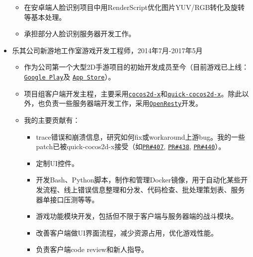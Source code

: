 \documentclass[letterpaper]{article}
\begin{document}
\begin{itemize}
\begin{itemize}
      \item 在安卓端人脸识别项目中用RenderScript优化图片YUV/RGB转化及旋转等基本处理。
      \item 承担部分人脸识别服务器开发工作。
    \end{itemize}
  \item 乐其公司新游地工作室游戏开发工程师，2014年7月-2017年5月
    \begin{itemize}
      \item 作为公司第一个大型2D手游项目的初始开发成员至今（目前游戏已上线：
        \href{https://play.google.com/store/apps/details?id=com.game168.yysg}{\tt Google Play}及
        \href{https://itunes.apple.com/us/app/ye-ye-san-guo/id976517523?mt=8}{\tt App Store}）。
      \item 项目组客户端开发主程，主要采用\href{http://cocos2d-x.org/}{\tt cocos2d-x}和\href{https://github.com/dualface/v3quick}{\tt quick-cocos2d-x}。除此以外，也负责一些服务器端开发工作，采用\href{https://github.com/openresty/openresty}{\tt OpenResty}开发。
      \item 我的主要贡献有：
        \begin{itemize}
          \item trace错误和崩溃信息，研究如何fix或workaround上游bug。我的一些patch已被quick-cocos2d-x接受（如\href{https://github.com/dualface/v3quick/pull/407}{\tt PR\#407}, \href{https://github.com/dualface/v3quick/pull/438}{\tt PR\#438}, \href{https://github.com/dualface/v3quick/pull/440}{\tt PR\#440}）。
          \item 定制UI控件。
          \item 开发Bash、Python脚本，制作和管理Docker镜像，用于自动化某些开发流程、线上错误信息整理和分发、代码检查、批处理策划表、服务器单接口压测等等。
          \item 游戏功能模块开发，包括但不限于客户端与服务器端的战斗模块。
          \item 改善客户端做UI界面流程，减少资源占用，优化游戏性能。
          \item 负责客户端code review和新人指导。
        \end{itemize}
    \end{itemize}
\end{itemize}
\end{document}

